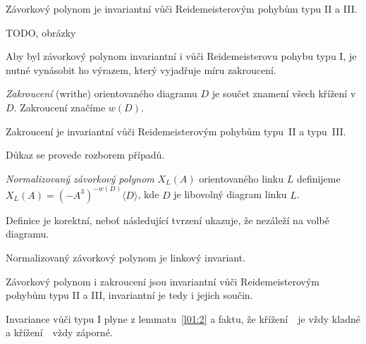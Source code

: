 \begin{tvrz}\label{t01:3}
Závorkový polynom je invariantní vůči Reidemeisterovým pohybům typu II a III.
\end{tvrz}
\begin{dukaz}
TODO, obrázky
\end{dukaz}

Aby byl závorkový polynom invariantní i vůči Reidemeisterovu pohybu typu I, je nutné vynásobit ho výrazem, který vyjadřuje míru zakroucení.

\begin{definice}\label{def01:3}
\emph{Zakroucení} (writhe) orientovaného diagramu $D$ je součet znamení všech křížení v $D$. Zakroucení značíme $w(D)$.
\end{definice}

\begin{lemma}\label{l01:4}
Zakroucení je invariantní vůči Reidemeisterovým pohybům typu~II a typu~III.
\end{lemma}
\begin{dukaz}
Důkaz se provede rozborem případů.
\end{dukaz}

\begin{definice}\label{def01:4}
\emph{Normalizovaný závorkový polynom} $X_L(A)$ orientovaného linku $L$ definijeme $X_L(A) = (-A^3)^{-w(D)}\langle D \rangle$, kde $D$ je libovolný diagram linku $L$.
\end{definice}

Definice je korektní, neboť následující tvrzení ukazuje, že nezáleží na volbě diagramu.

\begin{tvrz}\label{t01:5}
Normalizovaný závorkový polynom je linkový invariant.
\end{tvrz}
\begin{dukaz}
Závorkový polynom i zakroucení jsou invariantní vůči Reidemeisterovým pohybům typu II a III, invariantní je tedy i jejich součin.

Invariance vůči typu I plyne z lemmatu~\ref{l01:2} a faktu, že křížení~\plussmycka~je vždy kladné a křížení~\minussmycka~vždy záporné.
\end{dukaz}


